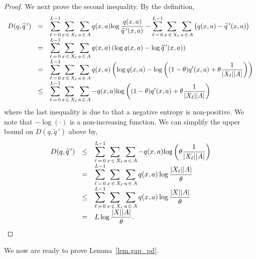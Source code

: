 \documentclass[12pt, final]{l4dc2023}
\begin{document}
\begin{proof}
	We next prove the second inequality. By the definition,
	\[
	\begin{array}{rcl}
	D(q,\widetilde{q}{\,'})  
	& = & 
	\displaystyle
	\sum_{\ell\,=\,0}^{L-1} \sum_{x\,\in\,X_\ell} \sum_{a\,\in\,A} q(x,a) {\log\frac{q(x,a)}{\widetilde q{\,'}(x,a)} }
	-\sum_{\ell\,=\,0}^{L-1} \sum_{x\,\in\,X_\ell} \sum_{a\,\in\,A}  \big(q(x,a)-\widetilde{q}{\,'}(x,a)\big)
	\\[0.2cm]
	& = & 
	\displaystyle
	\sum_{\ell\,=\,0}^{L-1} \sum_{x\,\in\,X_\ell} \sum_{a\,\in\,A} q(x,a) \left(\log{ q(x,a)}  -  \log{\widetilde q{\,'}(x,a)} \right)
	\\[0.2cm]
	& = & 
	\displaystyle
	\sum_{\ell\,=\,0}^{L-1} \sum_{x\,\in\,X_\ell} \sum_{a\,\in\,A} q(x,a) \left(\log{ q(x,a)}  -  \log\left((1-\theta) q'(x,a) + \theta\frac{1}{|X_\ell||A|}\right) \right)
	\\[0.2cm]
	& \leq & 
	\displaystyle
	\sum_{\ell\,=\,0}^{L-1} \sum_{x\,\in\,X_\ell} \sum_{a\,\in\,A} -q(x,a) {  \log\left((1-\theta) q'(x,a) + \theta\frac{1}{|X_\ell||A|}\right) }
	\end{array}
	\]
	where the last inequality is due to that a negative entropy is non-positive. We note that $-\log (\cdot)$ is a non-increasing function. We can simplify the upper bound on $D(q,\tilde{q}{\,'})$ above by,
	\[
	\begin{array}{rcl}
	D(q,\widetilde{q}{\,'}) 
	& \leq & 
	\displaystyle
	\sum_{\ell\,=\,0}^{L-1} \sum_{x\,\in\,X_\ell} \sum_{a\,\in\,A} -q(x,a) {  \log\left(\theta\frac{1}{|X_\ell||A|}\right) }
	\\[0.2cm]
	& = & 
	\displaystyle
	\sum_{\ell\,=\,0}^{L-1} \sum_{x\,\in\,X_\ell} \sum_{a\,\in\,A} q(x,a)  \log{\frac{|X_\ell||A|}{\theta}} 
	\\[0.2cm]
	& \leq  & 
	\displaystyle
	\sum_{\ell\,=\,0}^{L-1} \sum_{x\,\in\,X_\ell}  \sum_{a\,\in\,A} q(x,a)  \log{\frac{|X||A|}{\theta}}
	\\[0.2cm]
	& =  & 
	\displaystyle  L \log \frac{|X||A|}{\theta}.
	\end{array}
	\]
\end{proof}

We now are ready to prove Lemma~\ref{lem.gap_pd}. 
\end{document}
